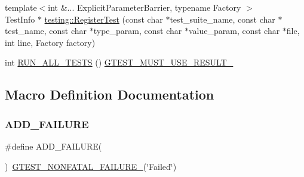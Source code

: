 \begin{DoxyCompactItemize}
\item 
{\footnotesize template$<$int \&... Explicit\+Parameter\+Barrier, typename Factory $>$ }\\Test\+Info $\ast$ \mbox{\hyperlink{namespacetesting_a8b90d759c019a155800afdd4b8d623c3}{testing\+::\+Register\+Test}} (const char $\ast$test\+\_\+suite\+\_\+name, const char $\ast$test\+\_\+name, const char $\ast$type\+\_\+param, const char $\ast$value\+\_\+param, const char $\ast$file, int line, Factory factory)
\item 
int \mbox{\hyperlink{_obj__test_2lib_2googletest-master_2googletest_2include_2gtest_2gtest_8h_a853a3792807489591d3d4a2f2ff9359f}{R\+U\+N\+\_\+\+A\+L\+L\+\_\+\+T\+E\+S\+TS}} () \mbox{\hyperlink{_obj__test_2lib_2googletest-release-1_88_81_2googletest_2include_2gtest_2internal_2gtest-port_8h_a8e5aab8276b2645f64f41c9e3021b935}{G\+T\+E\+S\+T\+\_\+\+M\+U\+S\+T\+\_\+\+U\+S\+E\+\_\+\+R\+E\+S\+U\+L\+T\+\_\+}}
\end{DoxyCompactItemize}


\subsection{Macro Definition Documentation}
\mbox{\label{_obj__test_2lib_2googletest-master_2googletest_2include_2gtest_2gtest_8h_adc16b5b0a740c39084ea5c9e960e3063}} 
\subsubsection{\texorpdfstring{ADD\_FAILURE}{ADD\_FAILURE}}
{\footnotesize\ttfamily \#define A\+D\+D\+\_\+\+F\+A\+I\+L\+U\+RE(\begin{DoxyParamCaption}{ }\end{DoxyParamCaption})~\mbox{\hyperlink{_obj__test_2lib_2googletest-release-1_88_81_2googletest_2include_2gtest_2internal_2gtest-internal_8h_a6cb7482cfa03661a91c698eb5895f642}{G\+T\+E\+S\+T\+\_\+\+N\+O\+N\+F\+A\+T\+A\+L\+\_\+\+F\+A\+I\+L\+U\+R\+E\+\_\+}}(\char`\"{}Failed\char`\"{})}

\mbox{\label{_obj__test_2lib_2googletest-master_2googletest_2include_2gtest_2gtest_8h_a448d7e5105b640e892fd8153fbee0b7f}} 
